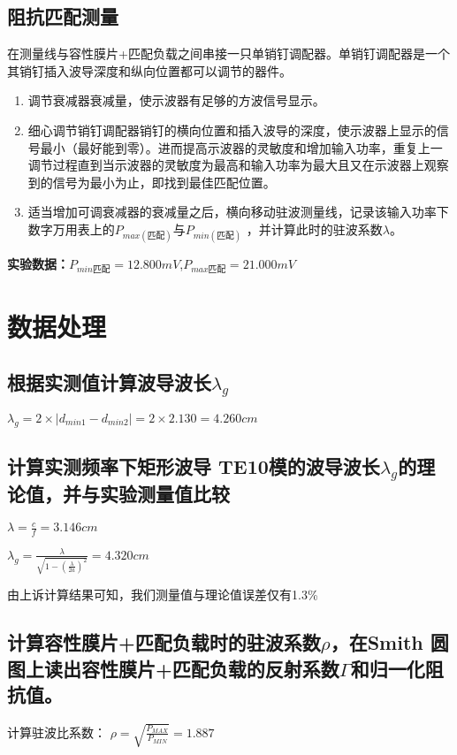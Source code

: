 \documentclass{../source/zjureport}
\begin{document}
        \subsection{阻抗匹配测量}
        在测量线与容性膜片+匹配负载之间串接一只单销钉调配器。单销钉调配器是一个其销钉插入波导深度和纵向位置都可以调节的器件。
        \begin{enumerate}
            \item 调节衰减器衰减量，使示波器有足够的方波信号显示。
            \item 细心调节销钉调配器销钉的横向位置和插入波导的深度，使示波器上显示的信号最小（最好能到零）。进而提高示波器的灵敏度和增加输入功率，重复上一调节过程直到当示波器的灵敏度为最高和输入功率为最大且又在示波器上观察到的信号为最小为止，即找到最佳匹配位置。
            \item 
            适当增加可调衰减器的衰减量之后，横向移动驻波测量线，记录该输入功率下数字万用表上的$P_{max(\text{匹配})}$与$P_{min(\text{匹配})} $ ，并计算此时的驻波系数$\lambda$。
        \end{enumerate}
        {\bf 实验数据：}$P_{min\text{匹配}} = 12.800mV$,$P_{max\text{匹配}} = 21.000mV$

    \section{数据处理}
        \subsection{根据实测值计算波导波长$\lambda_g$}
        $\lambda_g = 2\times |d_{min1} - d_{min2}| = 2\times 2.130 = 4.260cm$
        \subsection{计算实测频率下矩形波导 TE10模的波导波长$\lambda_g$的理论值，并与实验测量值比较}
        $\lambda = \displaystyle \frac{c}{f} = 3.146cm$

        $\lambda_{g}= \displaystyle \frac{\lambda}{\sqrt{1-\left(\displaystyle \frac{\lambda}{2 a}\right)^{2}}} = 4.320cm$

        由上诉计算结果可知，我们测量值与理论值误差仅有1.3\%

        \subsection{计算容性膜片+匹配负载时的驻波系数$\rho$，在Smith 圆图上读出容性膜片+匹配负载的反射系数$\Gamma$和归一化阻抗值。}
        计算驻波比系数：
        $\rho = \sqrt{\displaystyle \frac{P_{MAX}}{P_{MIN}}} = 1.887$
\end{document}
